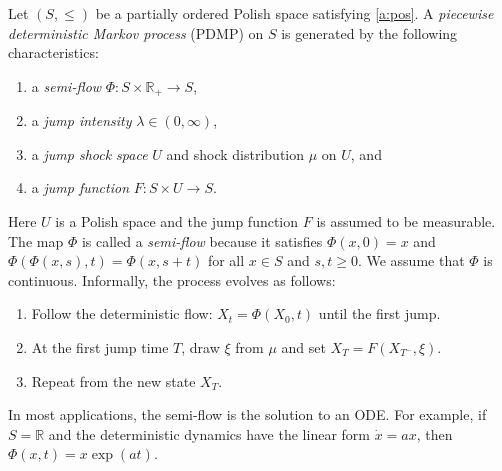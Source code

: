 \documentclass[12pt,reqno]{amsart}
\numberwithin{equation}{section}
\theoremstyle{definition}
\newcommand{\1}{\mathbbm{1}}
\newcommand{\RR}{\mathbb{R}}
\newcommand{\R}{\mathbb{R}}
\newcommand{\navy}[1]{\textit{\textcolor{blue!40!black}{#1}}}
\begin{document}
Let $(S, \leq)$ be a partially ordered Polish space satisfying \cref{a:pos}. A
\navy{piecewise deterministic Markov process} (PDMP) on $S$ is generated by the
following characteristics:
%
\begin{enumerate}
    \item a \navy{semi-flow} $\Phi \colon S \times \R_+ \to S$,
    \item a \navy{jump intensity} $\lambda \in (0,\infty)$,
    \item a \navy{jump shock space} $U$ and shock distribution $\mu$ on $U$,
        and
    \item a \navy{jump function} $F \colon S \times U \to S$. 
\end{enumerate}
%
Here $U$ is a Polish space and the jump function $F$ is assumed to be measurable.
The map $\Phi$ is called a \navy{semi-flow} because it satisfies $\Phi(x, 0) = x$
and $\Phi(\Phi(x, s), t) = \Phi(x, s + t)$ for all $x \in S$ and $s, t \geq 0$.
We assume that $\Phi$ is continuous.
Informally, the process evolves as follows:
%
\begin{enumerate}
    \item Follow the deterministic flow: $X_t = \Phi(X_0, t)$ until the first jump.
    \item At the first jump time $T$, draw $\xi$ from $\mu$ and set $X_T = F(X_{T^-}, \xi)$.
    \item Repeat from the new state $X_T$.
\end{enumerate}
%
In most applications, the semi-flow is the solution to an ODE.  For example, if
$S = \RR$ and the deterministic dynamics have the linear form $\dot x = a x$, then $\Phi(x, t) = x\exp(at)$.
\end{document}
